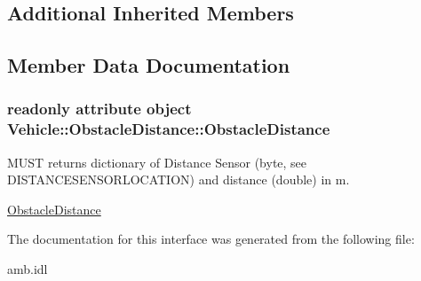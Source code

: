\subsection*{Additional Inherited Members}


\subsection{Member Data Documentation}
\hypertarget{interfaceVehicle_1_1ObstacleDistance_ac522de7d7254e19603edc217908b8a6b}{
\subsubsection[{Obstacle\-Distance}]{\setlength{\rightskip}{0pt plus 5cm}readonly attribute object Vehicle\-::\-Obstacle\-Distance\-::\-Obstacle\-Distance}}\label{interfaceVehicle_1_1ObstacleDistance_ac522de7d7254e19603edc217908b8a6b}


M\-U\-S\-T returns dictionary of Distance Sensor (byte, see D\-I\-S\-T\-A\-N\-C\-E\-S\-E\-N\-S\-O\-R\-L\-O\-C\-A\-T\-I\-O\-N) and distance (double) in m. 

\hyperlink{interfaceVehicle_1_1ObstacleDistance}{Obstacle\-Distance} 

The documentation for this interface was generated from the following file\-:\begin{DoxyCompactItemize}
\item 
amb.\-idl\end{DoxyCompactItemize}
